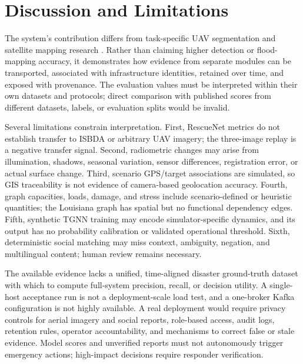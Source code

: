 \documentclass[conference]{IEEEtran}
\begin{document}
\section{Discussion and Limitations}
The system's contribution differs from task-specific UAV segmentation and satellite mapping research \cite{resc,zou,spacenet,selva}. Rather than claiming higher detection or flood-mapping accuracy, it demonstrates how evidence from separate modules can be transported, associated with infrastructure identities, retained over time, and exposed with provenance. The evaluation values must be interpreted within their own datasets and protocols; direct comparison with published scores from different datasets, labels, or evaluation splits would be invalid.

Several limitations constrain interpretation. First, RescueNet metrics do not establish transfer to ISBDA or arbitrary UAV imagery; the three-image replay is a negative transfer signal. Second, radiometric changes may arise from illumination, shadows, seasonal variation, sensor differences, registration error, or actual surface change. Third, scenario GPS/target associations are simulated, so GIS traceability is not evidence of camera-based geolocation accuracy. Fourth, graph capacities, loads, damage, and stress include scenario-defined or heuristic quantities; the Louisiana graph has spatial but no functional dependency edges. Fifth, synthetic TGNN training may encode simulator-specific dynamics, and its output has no probability calibration or validated operational threshold. Sixth, deterministic social matching may miss context, ambiguity, negation, and multilingual content; human review remains necessary.

The available evidence lacks a unified, time-aligned disaster ground-truth dataset with which to compute full-system precision, recall, or decision utility. A single-host acceptance run is not a deployment-scale load test, and a one-broker Kafka configuration is not highly available. A real deployment would require privacy controls for aerial imagery and social reports, role-based access, audit logs, retention rules, operator accountability, and mechanisms to correct false or stale evidence. Model scores and unverified reports must not autonomously trigger emergency actions; high-impact decisions require responder verification.
\end{document}
